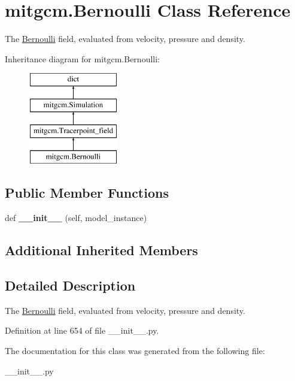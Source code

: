 \hypertarget{classmitgcm_1_1Bernoulli}{}\section{mitgcm.\+Bernoulli Class Reference}
\label{classmitgcm_1_1Bernoulli}


The \hyperlink{classmitgcm_1_1Bernoulli}{Bernoulli} field, evaluated from velocity, pressure and density.  


Inheritance diagram for mitgcm.\+Bernoulli\+:\begin{figure}[H]
\begin{center}
\leavevmode
\includegraphics[height=4.000000cm]{classmitgcm_1_1Bernoulli}
\end{center}
\end{figure}
\subsection*{Public Member Functions}
\begin{DoxyCompactItemize}
\item 
\hypertarget{classmitgcm_1_1Bernoulli_ae9b4ab5b3f46d1abb92b5d10e40c3b6a}{}def {\bfseries \+\_\+\+\_\+init\+\_\+\+\_\+} (self, model\+\_\+instance)\label{classmitgcm_1_1Bernoulli_ae9b4ab5b3f46d1abb92b5d10e40c3b6a}

\end{DoxyCompactItemize}
\subsection*{Additional Inherited Members}


\subsection{Detailed Description}
The \hyperlink{classmitgcm_1_1Bernoulli}{Bernoulli} field, evaluated from velocity, pressure and density. 



Definition at line 654 of file \+\_\+\+\_\+init\+\_\+\+\_\+.\+py.



The documentation for this class was generated from the following file\+:\begin{DoxyCompactItemize}
\item 
\+\_\+\+\_\+init\+\_\+\+\_\+.\+py\end{DoxyCompactItemize}
